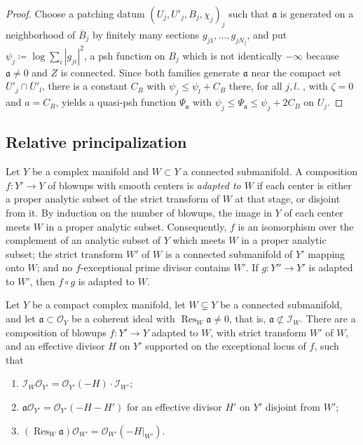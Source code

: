 \documentclass[11pt,a4paper]{amsart}
\newcommand{\rest}[1]{\operatorname{Res}_{#1}}   %
\theoremstyle{definition}
\begin{document}
\begin{proof}
Choose a patching datum $(U_j,U'_j,B_j,\chi_j)_j$ such that $\mathfrak a$
is generated on a neighborhood of $\overline B_j$ by finitely many
sections $g_{j1},\dots,g_{jN_j}$, and put
$\psi_j\coloneqq\log\sum_i|g_{ji}|^2$, a psh function on $B_j$ which is
not identically $-\infty$ because $\mathfrak a\ne0$ and $Z$ is connected.
Since both families generate $\mathfrak a$ near the compact set
$\overline U{}'_j\cap\overline U{}'_l$, there is a constant $C_B$ with
$\psi_j\le\psi_l+C_B$ there, for all $j,l$. , with
$\zeta=0$ and $a=C_B$, yields a quasi-psh function $\Psi_\mathfrak a$ with
$\psi_j\le\Psi_\mathfrak a\le\psi_j+2C_B$ on $U_j$.
\end{proof}

\subsection{Relative principalization}

Let $Y$ be a complex manifold and $W\subset Y$ a connected submanifold. A
composition $f\colon Y'\to Y$ of blowups with smooth centers is
\emph{adapted to $W$} if each center is either a proper analytic subset of
the strict transform of $W$ at that stage, or disjoint from it. By
induction on the number of blowups, the image in $Y$ of each center meets
$W$ in a proper analytic subset. Consequently, $f$ is an isomorphism over
the complement of an analytic subset of $Y$ which meets $W$ in a proper
analytic subset; the strict transform $W'$ of $W$ is a connected
submanifold of $Y'$ mapping onto $W$; and no $f$-exceptional prime
divisor contains $W'$. If $g\colon Y''\to Y'$ is adapted to $W'$, then
$f\circ g$ is adapted to $W$.

\begin{lemma}\label{lem:relative-principalization}
Let $Y$ be a compact complex manifold, let $W\subsetneq Y$ be a
connected submanifold, and let $\mathfrak a\subset\mathcal O_Y$ be a
coherent ideal with $\rest W\mathfrak a\ne0$, that is,
$\mathfrak a\not\subset\mathcal I_W$. There are a composition of blowups
$f\colon Y'\to Y$ adapted to $W$, with strict transform $W'$ of $W$, and an
effective divisor $H$ on $Y'$ supported on the exceptional locus of $f$,
such that
\begin{enumerate}[label=\textup{(\roman*)},leftmargin=*,itemsep=.2em,topsep=.3em]
\item\label{it:rp-ideal-W}
  $\mathcal I_W\mathcal O_{Y'}=\mathcal O_{Y'}(-H)\cdot\mathcal I_{W'}$;
\item\label{it:rp-principal}
  $\mathfrak a\mathcal O_{Y'}=\mathcal O_{Y'}(-H-H')$ for an effective
  divisor $H'$ on $Y'$ disjoint from $W'$;
\item\label{it:rp-restriction}
  $(\rest{W}\mathfrak a)\mathcal O_{W'}=\mathcal O_{W'}(-H|_{W'})$.
\end{enumerate}
\end{lemma}
\end{document}
